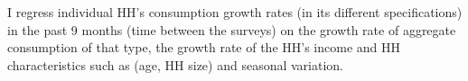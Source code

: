 \documentclass[12pt,a4paper]{article}
\begin{document}
I regress individual HH's consumption growth rates (in its different specifications) in the past 9 months (time between the surveys) on the growth rate of aggregate consumption of that type, the growth rate of the HH's income and HH characteristics such as (age, HH size) and seasonal variation. 










\end{document}
